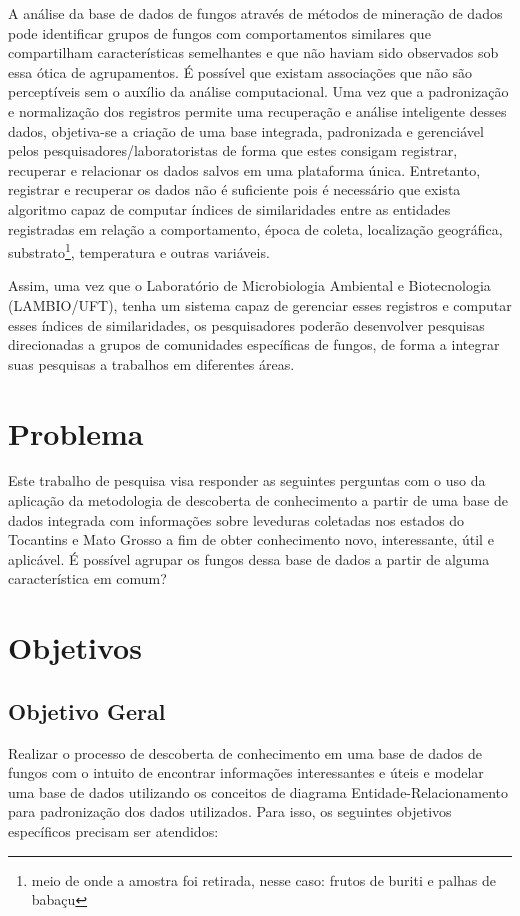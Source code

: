 \documentclass[tcc2]{classe_uftex/uftex}
\begin{document}
A análise da base de dados de fungos através de métodos de mineração de dados pode identificar grupos de fungos com comportamentos similares que compartilham características semelhantes e que não haviam sido observados sob essa ótica de agrupamentos. É possível que existam associações que não são perceptíveis sem o auxílio da análise computacional. Uma vez que a padronização e normalização dos registros permite uma recuperação e análise inteligente desses dados, objetiva-se a criação de uma base integrada, padronizada e gerenciável pelos pesquisadores/laboratoristas de forma que estes consigam registrar, recuperar e relacionar os dados salvos em uma plataforma única. Entretanto, registrar e recuperar os dados não é suficiente pois é necessário que exista algoritmo capaz de computar índices de similaridades entre as entidades registradas em relação a comportamento, época de coleta, localização geográfica, substrato\footnote{meio de onde a amostra foi retirada, nesse caso: frutos de buriti e palhas de babaçu}, temperatura e outras variáveis.

Assim, uma vez que o Laboratório de Microbiologia Ambiental e Biotecnologia (LAMBIO/UFT), tenha um sistema capaz de gerenciar esses registros e computar esses índices de similaridades, os pesquisadores poderão desenvolver pesquisas direcionadas a grupos de comunidades específicas de fungos, de forma a integrar suas pesquisas a trabalhos em diferentes áreas.

\section{Problema}
\label{sec:problema}
Este trabalho de pesquisa visa responder as seguintes perguntas com o uso da aplicação da metodologia de descoberta de conhecimento a partir de uma base de dados integrada com informações sobre leveduras coletadas nos estados do Tocantins e Mato Grosso a fim de obter conhecimento novo, interessante, útil e aplicável. É possível agrupar os fungos dessa base de dados a partir de alguma característica em comum? 

\section{Objetivos}
\label{sec:objetivos}
    \subsection{Objetivo Geral}
    \label{subsec:objetivo_geral}
    Realizar o processo de descoberta de conhecimento em uma base de dados de fungos com o intuito de encontrar informações interessantes e úteis e modelar uma base de dados utilizando os conceitos de diagrama Entidade-Relacionamento para padronização dos dados utilizados. Para isso, os seguintes objetivos específicos precisam ser atendidos:
    
\end{document}
